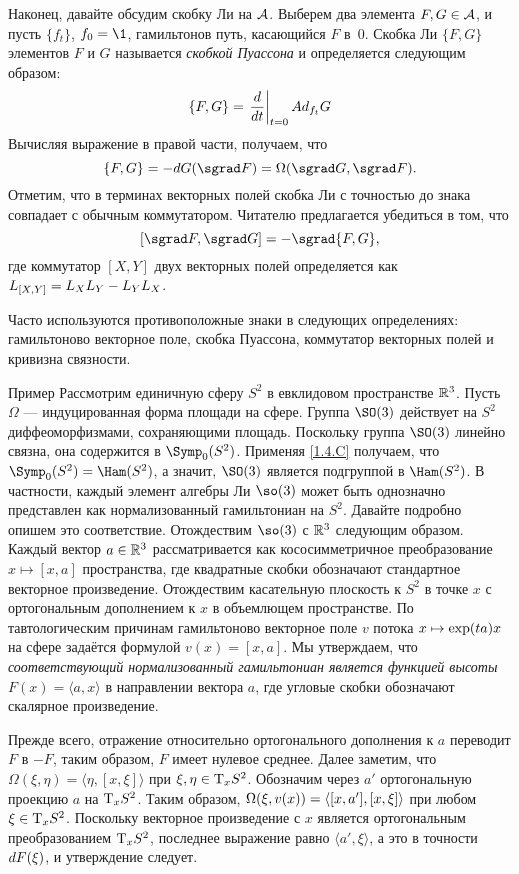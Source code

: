 {Наконец, давайте обсудим скобку Ли на $\mathcal{A}$.
Выберем два элемента $F,G \in \mathcal{A}$, и пусть $\{f_t\}$, $f_0 = \1$, гамильтонов путь, касающийся $F$ в~$0$.
Скобка Ли $\{F, G\}$ элементов $F$ и $G$ называется \emph{скобкой Пуассона} и определяется следующим образом: 
\[\{F, G\}=\left.\frac{d}{d t}\right|_{t=0}Ad_{f_t}G\]
Вычисляя выражение в правой части, получаем, что 
\[\{F, G\} = -\d G (\sgrad F) = \Omega (\sgrad G, \sgrad F).\]
Отметим, что в терминах векторных полей скобка Ли с точностью до знака совпадает с обычным коммутатором.
Читателю предлагается убедиться в том, что 
\[[\sgrad F, \sgrad G] = -\sgrad  \{F, G\},\]
где коммутатор $[X, Y]$ двух векторных полей определяется как $L_{[X, Y]} \z= L_X L_Y -L_Y L_X$.

\begin{framed}
Часто используются противоположные знаки в следующих определениях:
гамильтоново векторное поле,
скобка Пуассона,
коммутатор векторных полей
и кривизна связности.
\end{framed}

\begin{ex}{Пример}\label{1.4.H}
Рассмотрим единичную сферу $S^2$ в евклидовом пространстве $\mathbb{R}^3$.
Пусть $\Omega$ — индуцированная форма площади на сфере.
Группа $\SO(3)$ действует на $S^2$ диффеоморфизмами, сохраняющими площадь.
Поскольку группа $\SO(3)$ линейно связна, она содержится в $\Symp_0 (S^2)$.
Применяя \ref{1.4.C} получаем, что $\Symp_0 (S^2) \z= \Ham (S^2)$, а значит, $\SO (3)$ является подгруппой в $\Ham (S^2)$.
В частности, каждый элемент алгебры Ли $\so(3)$ может быть однозначно представлен как нормализованный гамильтониан на $S^2$.
Давайте подробно опишем это соответствие.
Отождествим $\so (3)$ с $\mathbb{R}^3$ следующим образом.
Каждый вектор $a \in \mathbb{R}^3$ рассматривается как кососимметричное преобразование $x \mapsto [x, a]$ пространства, где квадратные скобки обозначают стандартное векторное произведение.
Отождествим касательную плоскость к $S^2$ в точке $x$ с ортогональным
дополнением к $x$ в объемлющем пространстве.
По тавтологическим причинам гамильтоново векторное поле $v$ потока $x \z\mapsto \exp (ta) x$ на сфере задаётся формулой $v (x) = [x, a]$.
Мы утверждаем, что \textit{соответствующий нормализованный гамильтониан является
функцией высоты $F(x)=\langle a,x\rangle$} в направлении вектора $a$, 
где угловые скобки обозначают скалярное произведение.

Прежде всего, отражение относительно ортогонального дополнения к $a$ переводит $F$ в $-F$, таким образом, $F$ имеет нулевое среднее.
Далее заметим, что $\Omega (\xi, \eta) = \langle\eta, [x, \xi]\rangle$ при $\xi, \eta \in \mathrm{T}_x S^2$.
Обозначим через $a'$ ортогональную проекцию $a$ на $\mathrm{T}_x S^2$.
Таким образом, $\Omega (\xi, v(x)) \z= \langle[x, a'], [x, \xi]\rangle$ при любом $\xi \in \mathrm{T}_x S^2$.
Поскольку векторное произведение с $x$ является ортогональным преобразованием $\mathrm{T}_x S^2$, последнее выражение равно $\langle a', \xi\rangle$,
а это в точности $d F(\xi)$, и утверждение следует.
\end{ex}

}

